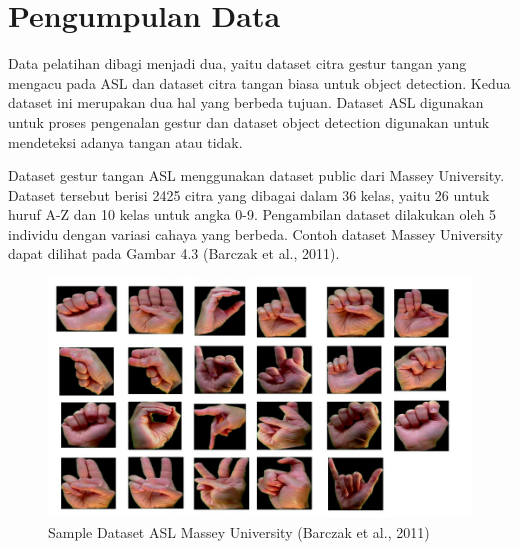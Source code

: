 \section{Pengumpulan Data}
Data pelatihan dibagi menjadi dua, yaitu dataset citra gestur tangan yang mengacu pada ASL dan dataset citra tangan biasa untuk object detection.
Kedua dataset ini merupakan dua hal yang berbeda tujuan. 
Dataset ASL digunakan untuk proses pengenalan gestur dan dataset object detection digunakan untuk mendeteksi adanya tangan atau tidak.

Dataset gestur tangan ASL menggunakan dataset public dari Massey University. Dataset tersebut berisi 2425 citra yang dibagai dalam 36 kelas, yaitu 26 untuk huruf A-Z dan 10 kelas untuk angka 0-9. Pengambilan dataset dilakukan oleh 5 individu dengan variasi cahaya yang berbeda. Contoh dataset Massey University dapat dilihat pada Gambar 4.3 (Barczak et al., 2011).
\begin{figure}[H]
	\centering
	\includegraphics[width=0.8\linewidth]{datasetasl}
	\caption{Sample Dataset ASL Massey University (Barczak et al., 2011)}
	\label{fig:datasetasl}
\end{figure}

